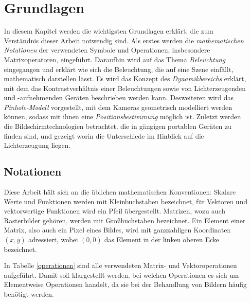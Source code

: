 \chapter{Grundlagen} \label{grundlagen}
 
 In diesem Kapitel werden die  wichtigsten Grundlagen erklärt, die zum Verständnis dieser Arbeit notwendig sind. 
 Als erstes werden die \emph{mathematischen Notationen} der verwendeten Symbole und Operationen, insbesondere Matrixoperatoren, eingeführt. 
 Daraufhin wird auf das Thema \emph{Beleuchtung} eingegangen und erklärt wie sich die Beleuchtung, die auf eine Szene einfällt, mathematisch darstellen lässt.
 Es wird das Konzept des \emph{Dynamikbereichs} erklärt, mit dem das Kontrastverhältnis einer Beleuchtungen sowie von Lichterzeugenden und -aufnehmenden Geräten beschrieben werden kann.
 Desweiteren wird das \emph{Pinhole-Modell} vorgestellt, mit dem Kameras geometrisch modelliert werden können, sodass mit ihnen eine \emph{Positionsbestimmung} möglich ist. 
 Zuletzt werden die Bildschirmtechnologien betrachtet. die in gängigen portablen Geräten zu finden sind, und gezeigt worin die Unterschiede im Hinblick auf die Lichterzeugung liegen.
 
 
  
\section{Notationen} \label{notation}

 Diese Arbeit hält sich an die üblichen mathematischen Konventionen:
 Skalare Werte und Funktionen werden mit Kleinbuchstaben bezeichnet, für Vektoren und vektorwertige Funktionen wird ein Pfeil übergestellt. 
 Matrizen, wozu auch Rasterbilder gehören, werden mit Großbuchstaben bezeichnet. 
 Ein Element einer Matrix, also auch ein Pixel eines Bildes, wird mit ganzzahligen Koordinaten $(x,y)$ adressiert, wobei $(0,0)$ das Element in der linken oberen Ecke bezeichnet.
 
 In Tabelle \ref{operationen}  sind alle verwendeten Matrix- und Vektoroperationen aufgeführt. 
 Damit soll klargestellt werden, bei welchen Operationen es sich um Elementweise Operationen handelt, da sie bei der Behandlung von Bildern häufig benötigt werden.

